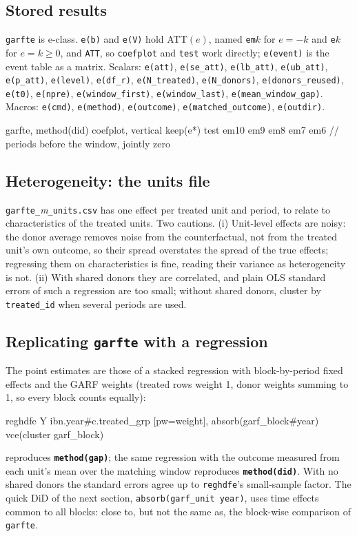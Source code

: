 \documentclass[11pt,a4paper]{article}
\newcommand{\opt}[1]{\texttt{\textbf{#1}}}
\newcommand{\code}[1]{\texttt{#1}}
\begin{document}
\subsection{Stored results}
{\sloppy \code{garfte} is e-class. \code{e(b)} and \code{e(V)} hold ATT$(e)$, named \code{em}$k$ for $e=-k$ and
\code{e}$k$ for $e=k\ge0$, and \code{ATT}, so \code{coefplot} and \code{test} work directly;
\code{e(event)} is the event table as a matrix. Scalars: \code{e(att)}, \code{e(se\_att)},
\code{e(lb\_att)}, \code{e(ub\_att)}, \code{e(p\_att)}, \code{e(level)}, \code{e(df\_r)},
\code{e(N\_treated)}, \code{e(N\_donors)}, \code{e(donors\_reused)}, \code{e(t0)}, \code{e(npre)},
\code{e(window\_first)}, \code{e(window\_last)}, \code{e(mean\_window\_gap)}. Macros: \code{e(cmd)},
\code{e(method)}, \code{e(outcome)}, \code{e(matched\_outcome)}, \code{e(outdir)}.\par}
\begin{stata}
garfte, method(did)
coefplot, vertical keep(e*)
test em10 em9 em8 em7 em6          // periods before the window, jointly zero
\end{stata}

\subsection{Heterogeneity: the units file}
\code{garfte\_}\emph{m}\code{\_units.csv} has one effect per treated unit and period, to relate to
characteristics of the treated units. Two cautions. (i) Unit-level effects are noisy: the donor
average removes noise from the counterfactual, not from the treated unit's own outcome, so their
spread overstates the spread of the true effects; regressing them on characteristics is fine,
reading their variance as heterogeneity is not. (ii) With shared donors they are correlated, and
plain OLS standard errors of such a regression are too small; without shared donors, cluster by
\code{treated\_id} when several periods are used.

\subsection{Replicating \texttt{garfte} with a regression}
The point estimates are those of a stacked regression with block-by-period fixed effects and the
GARF weights (treated rows weight 1, donor weights summing to 1, so every block counts equally):
\begin{stata}
reghdfe Y ibn.year#c.treated_grp [pw=weight], absorb(garf_block#year) vce(cluster garf_block)
\end{stata}
reproduces \opt{method(gap)}; the same regression with the outcome measured from each unit's mean
over the matching window reproduces \opt{method(did)}. With no shared donors the standard errors
agree up to \code{reghdfe}'s small-sample factor. The quick DiD of the next section,
\code{absorb(garf\_unit year)}, uses time effects common to all blocks: close to, but not the same
as, the block-wise comparison of \code{garfte}.
\end{document}
